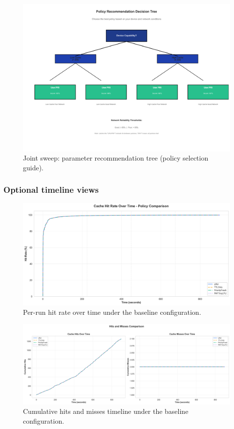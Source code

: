 \documentclass[11pt,twocolumn]{article}
\begin{document}
\begin{figure}[h]
    \centering
    \includegraphics[width=\linewidth]{figures/combined_recommendation_tree.png}
    \caption{Joint sweep: parameter recommendation tree (policy selection guide).}
    \label{fig:combined-reco-tree}
\end{figure}

\subsubsection{Optional timeline views}
\begin{figure}[h]
    \centering
    \includegraphics[width=\linewidth]{figures/timeline_hit_rate_timeline.png}
    \caption{Per-run hit rate over time under the baseline configuration.}
    \label{fig:timeline-hitrate}
\end{figure}

\begin{figure}[h]
    \centering
    \includegraphics[width=\linewidth]{figures/timeline_hits_misses_timeline.png}
    \caption{Cumulative hits and misses timeline under the baseline configuration.}
    \label{fig:timeline-hits-misses}
\end{figure}
\end{document}
